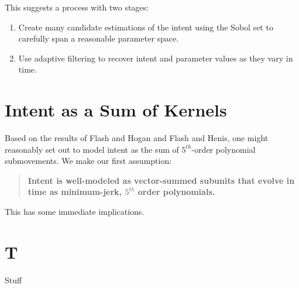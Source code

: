 \documentclass[10pt]{article}
\begin{document}
This suggests a process with two stages:
\begin{enumerate}
\item Create many candidate estimations of the intent using the Sobol set to carefully span a reasonable parameter space.
\item Use adaptive filtering to recover intent and parameter values as they vary in time.
\end{enumerate}

\section*{Intent as a Sum of Kernels}
Based on the results of Flash and Hogan and Flash and Henis, one might reasonably set out to model intent as the sum of $5^{th}$-order polynomial submovements. We make our first assumption:
\begin{quote}
\textbf{Intent is well-modeled as vector-summed subunits that evolve in time as minimum-jerk, $5^{th}$ order polynomials.}
\end{quote}
This has some immediate implications.



\section*{T}
Stuff
\end{document}
